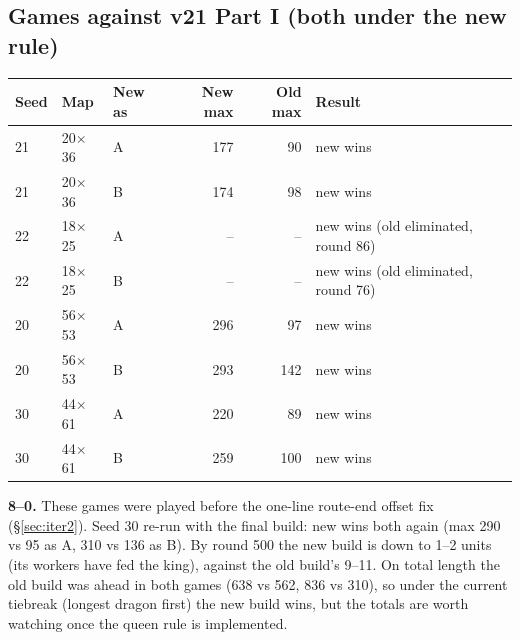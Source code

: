 \documentclass[11pt,a4paper]{article}
\begin{document}
\subsection{Games against v21 Part I (both under the new rule)}
\begin{center}
      \begin{tabular}{@{}lllrrl@{}}
            \toprule
            Seed & Map          & New as & New max & Old max & Result                              \\
            \midrule
            21   & 20$\times$36 & A      & 177     & 90      & new wins                            \\
            21   & 20$\times$36 & B      & 174     & 98      & new wins                            \\
            22   & 18$\times$25 & A      & --      & --      & new wins (old eliminated, round 86) \\
            22   & 18$\times$25 & B      & --      & --      & new wins (old eliminated, round 76) \\
            20   & 56$\times$53 & A      & 296     & 97      & new wins                            \\
            20   & 56$\times$53 & B      & 293     & 142     & new wins                            \\
            30   & 44$\times$61 & A      & 220     & 89      & new wins                            \\
            30   & 44$\times$61 & B      & 259     & 100     & new wins                            \\
            \bottomrule
      \end{tabular}
\end{center}
\textbf{8--0.} These games were played before the one-line route-end offset fix (\S\ref{sec:iter2}). Seed 30 re-run with the final
build: new wins both again (max 290 vs 95 as A, 310 vs 136 as B). By round 500 the new build is down to 1--2 units (its workers
have fed the king), against the old build's 9--11. On total length the old build was ahead in both games (638 vs 562, 836 vs 310), so
under the current tiebreak (longest dragon first) the new build wins, but the totals are worth watching once the queen rule
is implemented.
\end{document}
